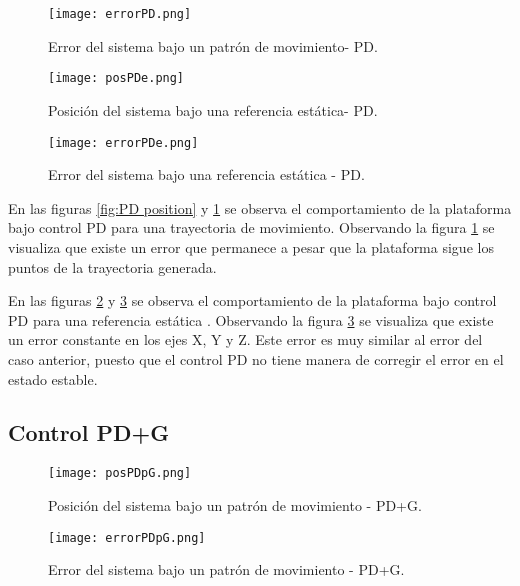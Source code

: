 \begin{figure}[h]
    \centering
    \texttt{[image: errorPD.png]}
    \caption{Error del sistema bajo un patrón de movimiento- PD.}
    \label{fig:PD error}
\end{figure}


\begin{figure}[h]
    \centering
    \texttt{[image: posPDe.png]}
    \caption{Posición del sistema bajo una referencia estática- PD.}
    \label{fig:PD positione}
\end{figure}

\begin{figure}[h]
    \centering
    \texttt{[image: errorPDe.png]}
    \caption{Error del sistema bajo una referencia estática - PD.}
    \label{fig:PD errore}
\end{figure}

En las figuras \ref{fig:PD position} y \ref{fig:PD error} se observa el comportamiento de la plataforma bajo control PD para una trayectoria de movimiento. Observando la figura \ref{fig:PD error} se visualiza que existe un error que permanece a pesar que la plataforma sigue los puntos de la trayectoria generada.

En las figuras \ref{fig:PD positione} y \ref{fig:PD errore} se observa el comportamiento de la plataforma bajo control PD para una referencia estática . Observando la figura \ref{fig:PD errore}  se visualiza que existe un error constante en los ejes X, Y y Z. Este error es muy similar al error del caso anterior, puesto que el control PD no tiene manera de corregir el error en el estado estable.

\subsection{Control PD+G}

\begin{figure}[h]
    \centering
    \texttt{[image: posPDpG.png]}
    \caption{Posición del sistema bajo un patrón de movimiento - PD+G.}
    \label{fig:PDG position}
\end{figure}

\begin{figure}[h]
    \centering
    \texttt{[image: errorPDpG.png]}
    \caption{Error del sistema bajo un patrón de movimiento - PD+G.}
    \label{fig:PDG error}
\end{figure}

